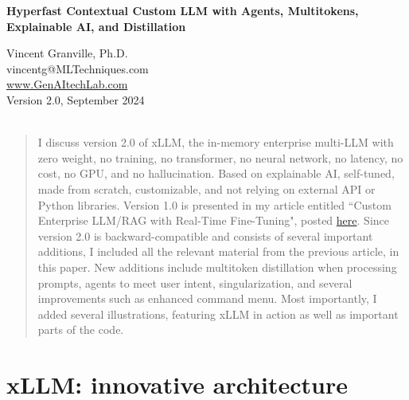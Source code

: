 \documentclass[10pt]{article}
\begin{document}
\hypersetup{linkcolor=blue}


\begin{center}
{\Large \bf{Hyperfast Contextual Custom LLM with Agents, Multitokens, \\ \addvspace{0.5ex} Explainable AI, and Distillation} 
}  \\
\addvspace{5ex}
\end{center}
 
\begin{center}
Vincent Granville, Ph.D.\\
 vincentg@MLTechniques.com\\
 \href{https://www.GenAItechLab.com/}{www.GenAItechLab.com}\\
\quad 
Version 2.0, September 2024  \\ \quad \\
\end{center}

\hypersetup{linkcolor=red}

\begin{abstract}I discuss version 2.0 of xLLM, the in-memory enterprise multi-LLM with zero weight, no training,
 no transformer, no neural network, no latency, no cost, no GPU, and no hallucination. Based on explainable AI, self-tuned, made from scratch, 
 customizable, and not relying on external API or Python libraries. 
Version 1.0 is presented in my article entitled 
``Custom Enterprise LLM/RAG with Real-Time Fine-Tuning", posted \href{https://mltblog.com/3WcTS9C}{here}. 
Since version 2.0 is backward-compatible and consists of several important additions, I included all the relevant material from the
 previous article, in this paper. New additions include multitoken distillation when processing prompts, agents to meet user intent, singularization,
 and several improvements such as enhanced command menu. Most importantly, I added several illustrations, featuring xLLM in action as well as 
 important parts of the code.
\end{abstract}

\tableofcontents

\section{xLLM: innovative architecture}
\end{document}
